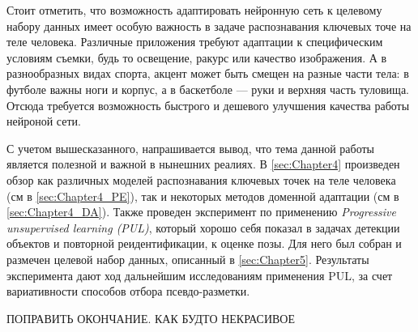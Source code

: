 Стоит отметить, что возможность адаптировать нейронную сеть к целевому набору данных имеет особую важность в задаче распознавания ключевых точе на теле человека. Различные приложения требуют адаптации к специфическим условиям съемки, будь то освещение, ракурс или качество изображения. А в разнообразных видах спорта, акцент может быть смещен на разные части тела: в футболе важны ноги и корпус, а в баскетболе — руки и верхняя часть туловища. Отсюда требуется возможность быстрого и дешевого улучшения качества работы нейроной сети. 

С учетом вышесказанного, напрашивается вывод, что тема данной работы является полезной и важной в нынешних реалиях. В \autoref{sec:Chapter4} произведен обзор как различных моделей распознавания ключевых точек на теле человека (см в \autoref{sec:Chapter4_PE}), так и некоторых методов доменной адаптации (см в \autoref{sec:Chapter4_DA}). Также проведен эксперимент по применению \textit{Progressive unsupervised learning (PUL)}, который хорошо себя показал в задачах детекции объектов и повторной реидентификации, к оценке позы. Для него был собран и размечен целевой набор данных, описанный в \autoref{sec:Chapter5}. Результаты эксперимента дают ход дальнейшим исследованиям применения PUL, за счет вариативности способов отбора псевдо-разметки.

ПОПРАВИТЬ ОКОНЧАНИЕ. КАК БУДТО НЕКРАСИВОЕ

\newpage